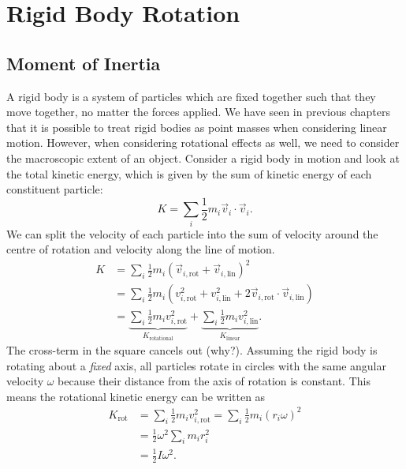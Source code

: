 \documentclass[../classical_mechanics.tex]{subfiles}
\begin{document}
    \section{Rigid Body Rotation}\label{sec:rigid-body-rotation}
        \subsection{Moment of Inertia}\label{subsec:moment-of-inertia}
            A rigid body is a system of particles which are fixed together such that they move together, no matter the forces applied.
            We have seen in previous chapters that it is possible to treat rigid bodies as point masses when considering linear motion.
            However, when considering rotational effects as well, we need to consider the macroscopic extent of an object.
            Consider a rigid body in motion and look at the total kinetic energy, which is given by the sum of kinetic energy of each constituent particle:
            \begin{equation}
                K=\sum_i\frac{1}{2}m_i\vec{v}_i\cdot\vec{v}_i.
            \end{equation}
            We can split the velocity of each particle into the sum of velocity around the centre of rotation and velocity along the line of motion.
            \begin{align}
                K&=\sum_i\frac{1}{2}m_i(\vec{v}_{i,\text{rot}}+\vec{v}_{i,\text{lin}})^2\\
                &=\sum_i\frac{1}{2}m_i(v_{i,\text{rot}}^2+v_{i,\text{lin}}^2+2\vec{v}_{i,\text{rot}}\cdot\vec{v}_{i,\text{lin}})\\
                &=\underbrace{\sum_i\frac{1}{2}m_iv_{i,\text{rot}}^2}_{K_\text{rotational}}+\underbrace{\sum_i\frac{1}{2}m_iv_{i,\text{lin}}^2}_{K_\text{linear}}.
            \end{align}
            The cross-term in the square cancels out (why?).
            Assuming the rigid body is rotating about a \textit{fixed} axis, all particles rotate in circles with the same angular velocity $\omega$ because their distance from the axis of rotation is constant.
            This means the rotational kinetic energy can be written as
            \begin{align}
                K_\text{rot}&=\sum_i\frac{1}{2}m_iv_{i,\text{rot}}^2=\sum_i\frac{1}{2}m_i(r_i\omega)^2\\
                &=\frac{1}{2}\omega^2\sum_i m_ir_i^2\\
                &=\frac{1}{2}I\omega^2.
            \end{align}
\end{document}
